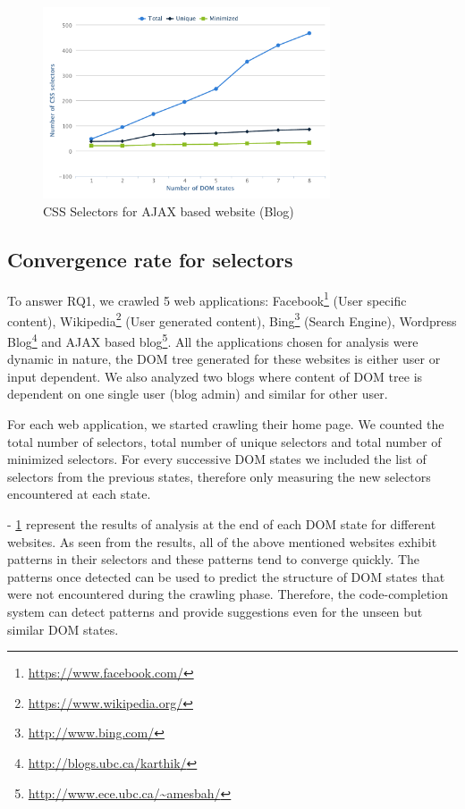 	\begin{figure}
		\centering
		\includegraphics[width=85mm]{images/ajax.pdf}
		\caption{CSS Selectors for AJAX based website (Blog)}
		\label{Fig:AJAX}
	\end{figure}
	
	\subsection{Convergence rate for \css selectors}
	\label{Sec:Convergence}
	To answer RQ1, we crawled 5 web applications: Facebook\footnote{\url{https://www.facebook.com/}} (User specific content), Wikipedia\footnote{\url{https://www.wikipedia.org/}} (User generated content), Bing\footnote{\url{http://www.bing.com/}} (Search Engine), Wordpress Blog\footnote{\url{http://blogs.ubc.ca/karthik/}} and AJAX based blog\footnote{\url{http://www.ece.ubc.ca/~amesbah/}}. All the applications chosen for analysis were dynamic in nature, \ie the DOM tree generated for these websites is either user or input dependent. We also analyzed two blogs where content of DOM tree is dependent on one single user (blog admin) and similar for other user. 
	
	For each web application, we started crawling their home page. We counted the total number of \css selectors, total number of unique \css selectors and total number of minimized \css selectors. For every successive DOM states we included the list of \css selectors from the previous states, therefore only measuring the new \css selectors encountered at each state. 
	
	 - \ref{Fig:AJAX} represent the results of analysis at the  end of each DOM state for different websites. As seen from the results, all of the above mentioned websites exhibit patterns in their \css selectors and these patterns tend to converge quickly. The patterns once detected can be used to predict the structure of DOM states that were not encountered during the crawling phase. Therefore, the code-completion system can detect patterns and provide suggestions even for the unseen but similar DOM states.
	
